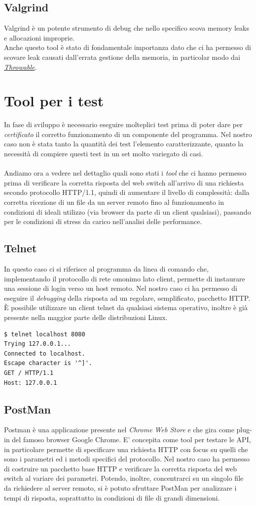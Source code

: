 \documentclass[italian]{tktltiki2}
\begin{document}
\subsection{Valgrind}
Valgrind\cite{valgrind} è un potente strumento di debug che nello specifico scova memory leaks e allocazioni improprie.
\\
Anche questo tool è stato di fondamentale importanza dato che ci ha permesso di scovare leak causati dall'errata gestione della memoria, in particolar modo dai \hyperref[sec:errors]{\emph{Throwable}}.

\newpage
\section{Tool per i test}
In fase di sviluppo è necessario eseguire molteplici test prima di poter dare per \emph{certificato} il corretto funzionamento di un componente del programma. Nel nostro caso non è stata tanto la quantità dei test l'elemento caratterizzante, quanto la necessità di compiere questi test in un set molto variegato di casi. 
\\
\\
Andiamo ora a vedere nel dettaglio quali sono stati i \emph{tool} che ci hanno permesso prima di verificare la corretta risposta del web switch all'arrivo di una richiesta secondo protocollo HTTP/1.1, quindi di aumentare il livello di complessità: dalla corretta ricezione di un file da un server remoto fino al funzionamento in condizioni di ideali utilizzo (via browser da parte di un client qualsiasi), passando per le condizioni di stress da carico nell'analisi delle performance.
\subsection{Telnet}
In questo caso ci si riferisce al programma da linea di comando che, implementando il protocollo di rete omonimo lato client, permette di instaurare una sessione di login verso un host remoto. Nel nostro caso ci ha permesso di eseguire il \emph{debugging} della risposta ad un regolare, semplificato, pacchetto HTTP. È possibile utilizzare un client telnet da qualsiasi sistema operativo, inoltre è già presente nella maggior parte delle distribuzioni Linux.
\begin{lstlisting}
$ telnet localhost 8080
Trying 127.0.0.1...
Connected to localhost.
Escape character is '^]'.
GET / HTTP/1.1
Host: 127.0.0.1
\end{lstlisting}
\subsection{PostMan}
Postman\cite{postman} è una applicazione presente nel \emph{Chrome Web Store} e che gira come plug-in del famoso browser Google Chrome. E' concepita come tool per testare le API, in particolare permette di specificare una richiesta HTTP con focus su quelli che sono i parametri ed i metodi specifici del protocollo. Nel nostro caso ha permesso di costruire un pacchetto base HTTP e verificare la corretta risposta del web switch al variare dei parametri. Potendo, inoltre, concentrarci su un singolo file da richiedere al server remoto, si è potuto sfruttare PostMan per analizzare i tempi di risposta, soprattutto in condizioni di file di grandi dimensioni.
\end{document}
